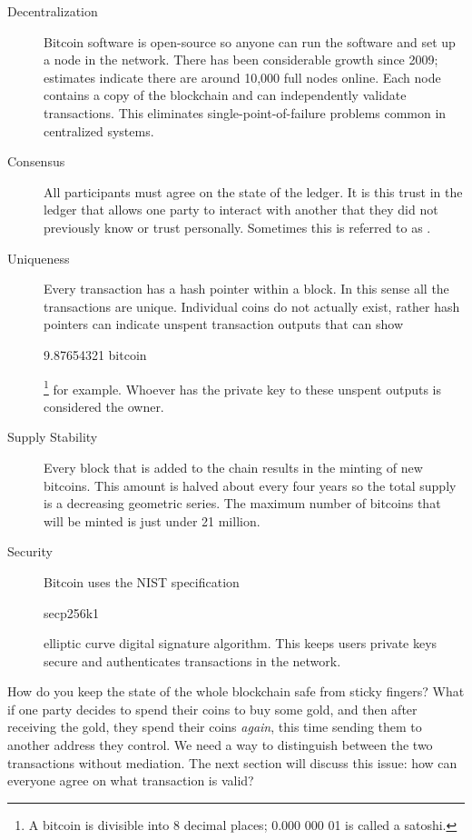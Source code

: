 \begin{description}
	\item [Decentralization] Bitcoin software is open-source so anyone can run the software and set up a node in the network. There has been considerable growth since 2009; estimates indicate there are around 10,000 full nodes online. Each node contains a copy of the blockchain and can independently validate transactions. This eliminates single-point-of-failure problems common in centralized systems.
	\item[Consensus] All participants must agree on the state of the ledger. It is this trust in the ledger that allows one party to interact with another that they did not previously know or trust personally. Sometimes this is referred to as .
	\item [Uniqueness] Every transaction has a hash pointer within a block. In this sense all the transactions are unique. Individual coins do not actually exist, rather hash pointers can indicate unspent transaction outputs that can show \begin{code}9.87654321 bitcoin\end{code}\footnote{A bitcoin is divisible into 8 decimal places; 0.000 000 01 is called a satoshi.} for example. Whoever has the private key to these unspent outputs is considered the owner.
	\item [Supply Stability] Every block that is added to the chain results in the minting of new bitcoins. This amount is halved about every four years so the total supply is a decreasing geometric series. The maximum number of bitcoins that will be minted is just under 21 million.
	\item [Security] Bitcoin uses the NIST specification \begin{code}secp256k1\end{code} elliptic curve digital signature algorithm. This keeps users private keys secure and authenticates transactions in the network.
 
\end{description}
How do you keep the state of the whole blockchain safe from sticky fingers? What if one party decides to spend their coins to buy some gold, and then after receiving the gold, they spend their coins \textit{again}, this time sending them to another address they control. We need a way to distinguish between the two transactions without mediation. The next section will discuss this issue: how can everyone agree on what transaction is valid?

